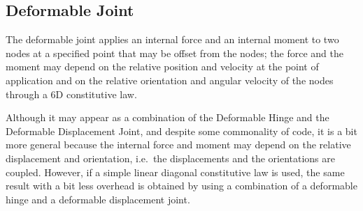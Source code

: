 \documentclass[10pt,dvips,fleqn,subeqn]{report}
\begin{document}
\subsection{Deformable Joint}
The deformable joint applies an internal force and an internal moment
to two nodes at a specified point that may be offset from the nodes;
the force and the moment may depend on the relative position and velocity
at the point of application and on the relative orientation and angular 
velocity of the nodes through a 6D constitutive law.

Although it may appear as a combination of the Deformable Hinge
and the Deformable Displacement Joint, and despite some commonality
of code, it is a bit more general because the internal force
and moment may depend on the relative displacement and orientation,
i.e.\ the displacements and the orientations are coupled.
However, if a simple linear diagonal constitutive law is used,
the same result with a bit less overhead is obtained by using
a combination of a deformable hinge and a deformable displacement joint.
\end{document}

